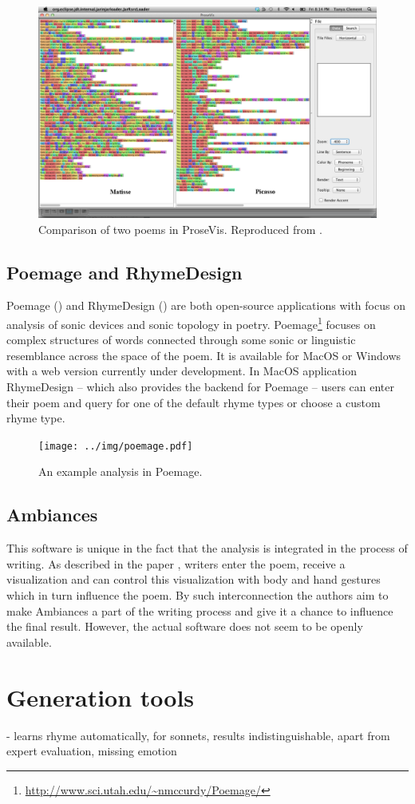 \begin{figure}[h]\centering
	\includegraphics[scale=0.24]{../img/prosevis.png}
	\caption[Comparison of two poems in ProseVis]{Comparison of two poems in ProseVis. Reproduced from \cite{prosevis2017sourceforge}.}\label{screenshotProsevis}
\end{figure}

\subsection{Poemage and RhymeDesign}
Poemage (\cite{McCurdy2015poemage}) and RhymeDesign (\cite{McCurdy2015}) are both open-source applications with focus on analysis of sonic devices and sonic topology in poetry. Poemage\footnote{\url{http://www.sci.utah.edu/~nmccurdy/Poemage/}} focuses on complex structures of words connected through some sonic or linguistic resemblance across the space of the poem. It is available for MacOS or Windows with a web version currently under development. In MacOS application RhymeDesign -- which also provides the backend for Poemage -- users can enter their poem and query for one of the default rhyme types or choose a custom rhyme type.

\begin{figure}[h]\centering
	\texttt{[image: ../img/poemage.pdf]}
	\caption{An example analysis in Poemage.}\label{screenshotPoemage}
\end{figure}

\subsection{Ambiances}
This software is unique in the fact that the analysis is integrated in the process of writing. As described in the paper \cite{Meneses2015}, writers enter the poem, receive a visualization and can control this visualization with body and hand gestures which in turn influence the poem. By such interconnection the authors aim to make Ambiances a part of the writing process and give it a chance to influence the final result. However, the actual software does not seem to be openly available.


\section{Generation tools}
\cite{lau2018deep} - learns rhyme automatically, for sonnets, results indistinguishable, apart from expert evaluation, missing emotion
